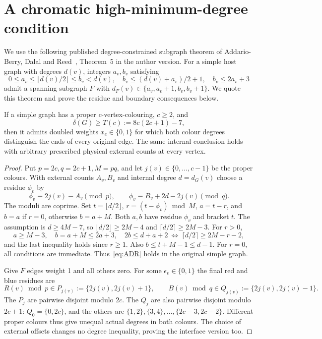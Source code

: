 \section{A chromatic high-minimum-degree condition}\label{sec:highdegree}

We use the following published degree-constrained subgraph theorem
of Addario-Berry, Dalal and Reed~\cite{ADR08}, Theorem~5 in the
author version. For a simple host graph with degrees $d(v)$, integers
$a_v,b_v$ satisfying
\begin{equation}\label{eq:ADR}
 0\le a_v\le\lfloor d(v)/2\rfloor\le b_v<d(v),\quad
 b_v\le(d(v)+a_v)/2+1,\quad b_v\le2a_v+3
\end{equation}
admit a spanning subgraph $F$ with
$d_F(v)\in\{a_v,a_v+1,b_v,b_v+1\}$. We quote this theorem and
prove the residue and boundary consequences below.

\begin{theorem}[D1]\label{thm:chromatic}
If a simple graph has a proper $c$-vertex-colouring, $c\ge2$, and
\[
 \delta(G)\ge T(c):=8c(2c+1)-7,
\]
then it admits doubled weights $x_e\in\{0,1\}$ for which both
colour degrees distinguish the ends of every original edge. The same
internal conclusion holds with arbitrary prescribed physical external
counts at every vertex.
\end{theorem}
\begin{proof}
Put $p=2c,q=2c+1,M=pq$, and let $j(v)\in\{0,\ldots,c-1\}$
be the proper colours. With external counts $A_v,B_v$ and internal
degree $d=d_G(v)$ choose a residue $\phi_v$ by
\[
 \phi_v\equiv2j(v)-A_v\pmod p,\qquad
 \phi_v\equiv B_v+2d-2j(v)\pmod q.
\]
The moduli are coprime. Set $t=\lfloor d/2\rfloor$,
$r=(t-\phi_v)\bmod M$, $a=t-r$, and $b=a$ if $r=0$, otherwise
$b=a+M$. Both $a,b$ have residue $\phi_v$ and bracket $t$.
The assumption is $d\ge4M-7$, so
$\lfloor d/2\rfloor\ge2M-4$ and $\lceil d/2\rceil\ge2M-3$.
For $r>0$,
\[
 a\ge M-3,\quad b=a+M\le2a+3,\quad
 2b\le d+a+2\ \Longleftrightarrow\
 \lceil d/2\rceil\ge2M-r-2,
\]
and the last inequality holds since $r\ge1$. Also
$b\le t+M-1\le d-1$. For $r=0$, all conditions are immediate.
Thus~\eqref{eq:ADR} holds in the original simple graph.

Give $F$ edges weight 1 and all others zero. For some
$\epsilon_v\in\{0,1\}$ the final red and blue residues are
\[
 R(v)\bmod p\in P_{j(v)}:=\{2j(v),2j(v)+1\},\qquad
 B(v)\bmod q\in Q_{j(v)}:=\{2j(v),2j(v)-1\}.
\]
The $P_j$ are pairwise disjoint modulo $2c$. The $Q_j$ are also
pairwise disjoint modulo $2c+1$: $Q_0=\{0,2c\}$, and the others
are $\{1,2\},\{3,4\},\ldots,\{2c-3,2c-2\}$. Different
proper colours thus give unequal actual degrees in both colours.
The choice of external offsets changes no degree inequality, proving
the interface version too.
\end{proof}

